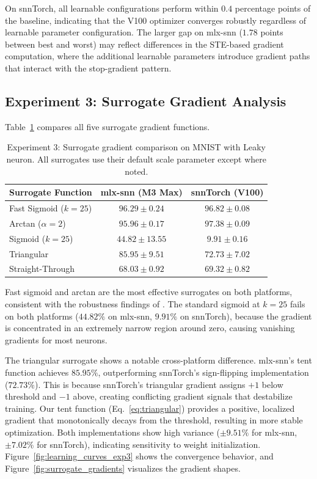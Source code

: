 \documentclass[11pt]{article}
\begin{document}
On snnTorch, all learnable configurations perform within $0.4$ percentage points of the baseline, indicating that the V100 optimizer converges robustly regardless of learnable parameter configuration. The larger gap on mlx-snn ($1.78$ points between best and worst) may reflect differences in the STE-based gradient computation, where the additional learnable parameters introduce gradient paths that interact with the stop-gradient pattern.

\subsection{Experiment 3: Surrogate Gradient Analysis}

Table~\ref{tab:exp3} compares all five surrogate gradient functions.

\begin{table}[H]
\centering
\caption{Experiment 3: Surrogate gradient comparison on MNIST with Leaky neuron. All surrogates use their default scale parameter except where noted.}
\label{tab:exp3}
\small
\begin{tabular}{lcc}
\toprule
\textbf{Surrogate Function} & \textbf{mlx-snn (M3 Max)} & \textbf{snnTorch (V100)} \\
\midrule
Fast Sigmoid ($k=25$) & $96.29 \pm 0.24$ & $96.82 \pm 0.08$ \\
Arctan ($\alpha=2$) & $95.96 \pm 0.17$ & $\mathbf{97.38 \pm 0.09}$ \\
Sigmoid ($k=25$) & $44.82 \pm 13.55$ & $9.91 \pm 0.16$ \\
Triangular & $85.95 \pm 9.51$ & $72.73 \pm 7.02$ \\
Straight-Through & $68.03 \pm 0.92$ & $69.32 \pm 0.82$ \\
\bottomrule
\end{tabular}
\end{table}

Fast sigmoid and arctan are the most effective surrogates on both platforms, consistent with the robustness findings of \citet{zenke2021remarkable}. The standard sigmoid at $k=25$ fails on both platforms ($44.82\%$ on mlx-snn, $9.91\%$ on snnTorch), because the gradient is concentrated in an extremely narrow region around zero, causing vanishing gradients for most neurons.

The triangular surrogate shows a notable cross-platform difference. mlx-snn's tent function achieves $85.95\%$, outperforming snnTorch's sign-flipping implementation ($72.73\%$). This is because snnTorch's triangular gradient assigns $+1$ below threshold and $-1$ above, creating conflicting gradient signals that destabilize training. Our tent function (Eq.~\ref{eq:triangular}) provides a positive, localized gradient that monotonically decays from the threshold, resulting in more stable optimization. Both implementations show high variance ($\pm 9.51\%$ for mlx-snn, $\pm 7.02\%$ for snnTorch), indicating sensitivity to weight initialization. Figure~\ref{fig:learning_curves_exp3} shows the convergence behavior, and Figure~\ref{fig:surrogate_gradients} visualizes the gradient shapes.
\end{document}
